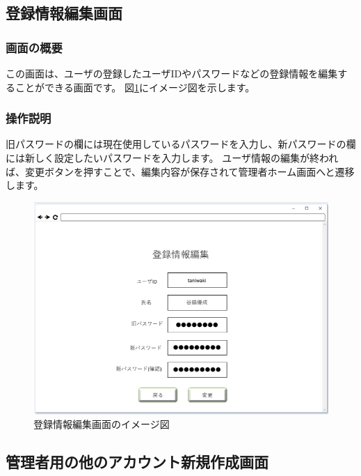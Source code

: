 \newpage

\subsection{登録情報編集画面}
\subsubsection{画面の概要}
この画面は、ユーザの登録したユーザIDやパスワードなどの登録情報を編集することができる画面です。
図\ref{fig:06}にイメージ図を示します。

\subsubsection{操作説明}
旧パスワードの欄には現在使用しているパスワードを入力し、新パスワードの欄には新しく設定したいパスワードを入力します。
ユーザ情報の編集が終われば、変更ボタンを押すことで、編集内容が保存されて管理者ホーム画面へと遷移します。

\begin{figure}[htbp]
  \begin{center}
    \includegraphics[width=1\linewidth,clip]{./img/06.png}
    \caption{登録情報編集画面のイメージ図}\label{fig:06}
  \end{center}
\end{figure}

\newpage

\subsection{管理者用の他のアカウント新規作成画面}
